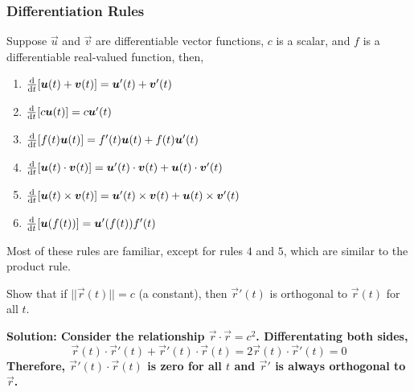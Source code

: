 \subsubsection{Differentiation Rules}
\begin{theorem}
    Suppose \(\vec u\) and \(\vec v\) are differentiable vector functions, \(c\) is a scalar, and \(f\) is a differentiable real-valued function, then,
    \begin{enumerate}
        \item \(\dv{t}\bqty{\vec u(t) + \vec v(t)} = \vec u'(t) + \vec v'(t)\)
        \item \(\dv{t}\bqty{c\vec u(t)} = c\vec u'(t)\)
        \item \(\dv{t}\bqty{f(t)\vec u(t)} = f'(t)\vec u(t) + f(t)\vec u'(t)\)
        \item \(\dv{t}\bqty{\vec u(t)\cdot \vec v(t)} = \vec u'(t)\cdot \vec v(t) + \vec u(t) \cdot \vec v'(t)\)
        \item \(\dv{t}\bqty{\vec u(t)\times \vec v(t)} = \vec u'(t) \times \vec v(t) + \vec u(t)\times \vec v'(t)\)
        \item \(\dv{t}\bqty{\vec u(f(t))} = \vec u'(f(t))f'(t)\)
    \end{enumerate}
    Most of these rules are familiar, except for rules \(4\) and \(5\), which are similar to the product rule.
\end{theorem}
\begin{example}
    Show that if \(||\vec r(t)|| = c\) (a constant), then \(\vec r'(t)\) is orthogonal to \(\vec r(t)\) for all \(t\). \par\bf{Solution: }Consider the relationship \(\vec r\cdot \vec r = c^2\). Differentating both sides, 
    \[ \vec r(t) \cdot \vec r'(t) + \vec r'(t) \cdot \vec r(t) = 2\vec r(t)\cdot \vec r'(t) = 0\]
    Therefore, \(\vec r'(t)\cdot \vec r(t)\) is zero for all \(t\) and \(\vec r'\) is always orthogonal to \(\vec r\).
\end{example}
